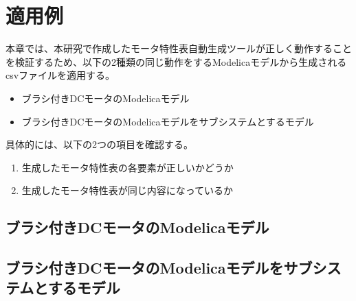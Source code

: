 \chapter{適用例}\label{cha:Indication}
本章では、本研究で作成したモータ特性表自動生成ツールが正しく動作することを検証するため、以下の2種類の同じ動作をするModelicaモデルから生成されるcsvファイルを適用する。
\begin{itemize}
    \item ブラシ付きDCモータのModelicaモデル
    \item ブラシ付きDCモータのModelicaモデルをサブシステムとするモデル
\end{itemize}
具体的には、以下の2つの項目を確認する。
\begin{enumerate}
    \item 生成したモータ特性表の各要素が正しいかどうか
    \item 生成したモータ特性表が同じ内容になっているか
\end{enumerate}
\section{ブラシ付きDCモータのModelicaモデル}


\section{ブラシ付きDCモータのModelicaモデルをサブシステムとするモデル}
